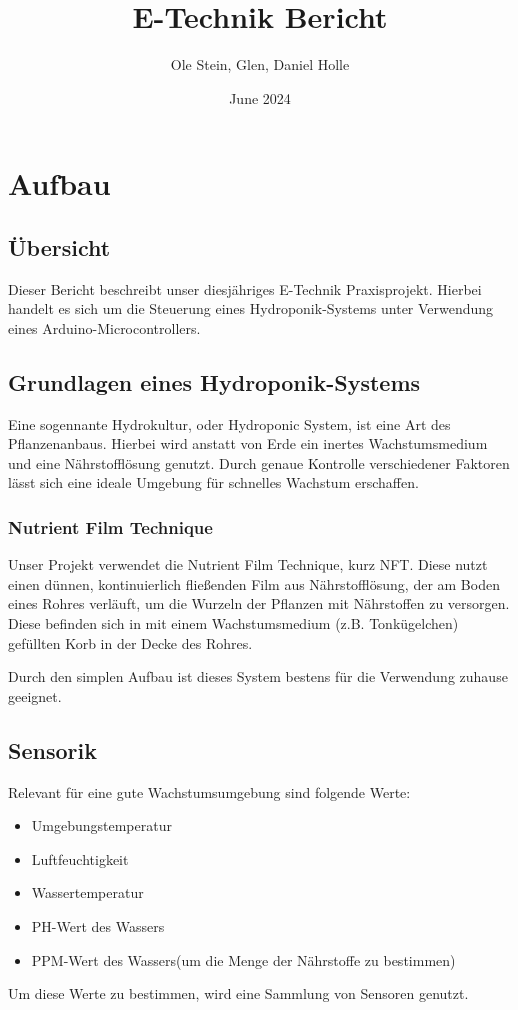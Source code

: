 \documentclass{report}
\title{E-Technik Bericht}
\author{Ole Stein, Glen, Daniel Holle }
\date{June 2024}
\begin{document}
\maketitle

\chapter{Aufbau}

\section{Übersicht}
Dieser Bericht beschreibt unser diesjähriges E-Technik Praxisprojekt. Hierbei handelt es sich um die Steuerung eines Hydroponik-Systems unter Verwendung eines Arduino-Microcontrollers. 

\section{Grundlagen eines Hydroponik-Systems}
Eine sogennante Hydrokultur, oder Hydroponic System, ist eine Art des Pflanzenanbaus. Hierbei wird anstatt von Erde ein inertes Wachstumsmedium und eine Nährstofflösung genutzt. Durch genaue Kontrolle verschiedener Faktoren lässt sich eine ideale Umgebung für schnelles Wachstum erschaffen.
\subsection{Nutrient Film Technique}
Unser Projekt verwendet die Nutrient Film Technique, kurz NFT. Diese nutzt einen dünnen, kontinuierlich fließenden Film aus Nährstofflösung, der am Boden eines Rohres verläuft, um die Wurzeln der Pflanzen mit Nährstoffen zu versorgen. Diese befinden sich in mit einem Wachstumsmedium (z.B. Tonkügelchen) gefüllten Korb in der Decke des Rohres. 

Durch den simplen Aufbau ist dieses System bestens für die Verwendung zuhause geeignet. 

\section{Sensorik}
Relevant für eine gute Wachstumsumgebung sind folgende Werte:
\begin{itemize}
    \item Umgebungstemperatur
    \item Luftfeuchtigkeit
    \item Wassertemperatur
    \item PH-Wert des Wassers
    \item PPM-Wert des Wassers(um die Menge der Nährstoffe zu bestimmen)
\end{itemize}
Um diese Werte zu bestimmen, wird eine Sammlung von Sensoren genutzt. 
\end{document}
